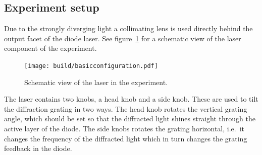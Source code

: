 \subsection{Experiment setup}\label{experiment-setup}
Due to the strongly diverging light a collimating lens is used directly behind the output facet of
the diode laser.
See figure~\ref{fig:experiment-setup} for a schematic view of the laser component of the
experiment.

\begin{figure}[ht]
  \centering
  \texttt{[image: build/basicconfiguration.pdf]}
  \caption{Schematic view of the laser in the experiment\cite{anleitung}.}%
  \label{fig:experiment-setup}
\end{figure}

The laser contains two knobs, a head knob and a side knob.
These are used to tilt the diffraction grating in two ways.
The head knob rotates the vertical grating angle,
which should be set so that the diffracted light shines straight through the active layer of the
diode.
The side knobs rotates the grating horizontal, i.e.\ it changes the frequency of the diffracted
light which in turn changes the grating feedback in the diode.

